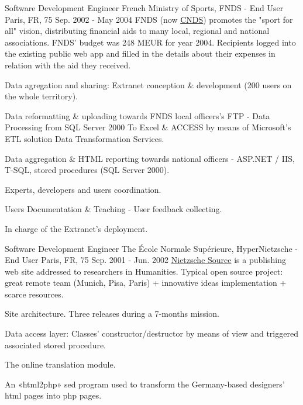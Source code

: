 \begin{cventries}
  \cventry
    {Software Development Engineer} %
    {French Ministry of Sports, FNDS - End User} %
    {Paris, FR, 75} %
    {Sep. 2002 - May 2004} %
    {FNDS (now \href{http://www.cnds.sports.gouv.fr}{CNDS}) promotes the "sport for all" vision, distributing financial aids to many local, regional and national associations. FNDS' budget was 248 MEUR for year 2004. Recipients logged into the existing public web app and filled in the details about their expenses in relation with the aid they received.} %
{
      \begin{cvitems} %
        \item {Data agregation and sharing: Extranet conception \& development (200 users on the whole territory).}
        \item {Data reformatting \& uploading towards FNDS local officers's FTP - Data Processing from SQL Server 2000 To Excel \& ACCESS by means of Microsoft's ETL solution Data Transformation Services.}
        \item {Data aggregation \& HTML reporting towards national officers - ASP.NET / IIS, T-SQL, stored procedures (SQL Server 2000).}
        \item {Experts, developers and users coordination.}
        \item {Users Documentation \& Teaching - User feedback collecting.}
        \item {In charge of the Extranet's deployment.}
      \end{cvitems}
} %

  \cventry
    {Software Development Engineer} %
    {The \'Ecole Normale Supérieure, HyperNietzsche - End User} %
    {Paris, FR, 75} %
    {Sep. 2001 - Jun. 2002} %
{
\href{http://www.nietzschesource.org}{Nietzsche Source} is a publishing web site addressed to researchers in Humanities.
Typical open source project: great remote team (Munich, Pisa, Paris) + innovative ideas implementation + scarce resources.
} %
{
      \begin{cvitems} %
        \item {Site architecture. Three releases during a 7-months mission.}
        \item {Data access layer: Classes’ constructor/destructor by means of view and triggered associated stored procedure.}
        \item {The online translation module.}
        \item {An «html2php» sed program used to transform the Germany-based designers' html pages into php pages.}
      \end{cvitems}
} %


\end{cventries}
